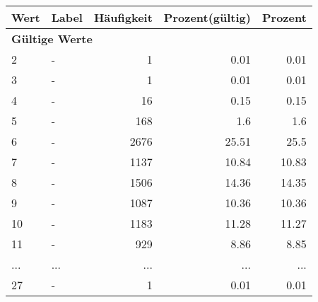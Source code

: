      \begin{longtable}{lXrrr}
     \toprule
     \textbf{Wert} & \textbf{Label} & \textbf{Häufigkeit} & \textbf{Prozent(gültig)} & \textbf{Prozent} \\
     \endhead
     \midrule
     \multicolumn{5}{l}{\textbf{Gültige Werte}}\\
        2 & \multicolumn{1}{X}{-} & %
          \num{1} &
          \num[round-mode=places,round-precision=2]{0.01} &
          \num[round-mode=places,round-precision=2]{0.01} \\
        3 & \multicolumn{1}{X}{-} & %
          \num{1} &
          \num[round-mode=places,round-precision=2]{0.01} &
          \num[round-mode=places,round-precision=2]{0.01} \\
        4 & \multicolumn{1}{X}{-} & %
          \num{16} &
          \num[round-mode=places,round-precision=2]{0.15} &
          \num[round-mode=places,round-precision=2]{0.15} \\
        5 & \multicolumn{1}{X}{-} & %
          \num{168} &
          \num[round-mode=places,round-precision=2]{1.6} &
          \num[round-mode=places,round-precision=2]{1.6} \\
        6 & \multicolumn{1}{X}{-} & %
          \num{2676} &
          \num[round-mode=places,round-precision=2]{25.51} &
          \num[round-mode=places,round-precision=2]{25.5} \\
        7 & \multicolumn{1}{X}{-} & %
          \num{1137} &
          \num[round-mode=places,round-precision=2]{10.84} &
          \num[round-mode=places,round-precision=2]{10.83} \\
        8 & \multicolumn{1}{X}{-} & %
          \num{1506} &
          \num[round-mode=places,round-precision=2]{14.36} &
          \num[round-mode=places,round-precision=2]{14.35} \\
        9 & \multicolumn{1}{X}{-} & %
          \num{1087} &
          \num[round-mode=places,round-precision=2]{10.36} &
          \num[round-mode=places,round-precision=2]{10.36} \\
        10 & \multicolumn{1}{X}{-} & %
          \num{1183} &
          \num[round-mode=places,round-precision=2]{11.28} &
          \num[round-mode=places,round-precision=2]{11.27} \\
        11 & \multicolumn{1}{X}{-} & %
          \num{929} &
          \num[round-mode=places,round-precision=2]{8.86} &
          \num[round-mode=places,round-precision=2]{8.85} \\
       ... & ... & ... & ... & ... \\
        27 & \multicolumn{1}{X}{-} & %
          \num{1} &
          \num[round-mode=places,round-precision=2]{0.01} &
          \num[round-mode=places,round-precision=2]{0.01} \\


\end{longtable}
